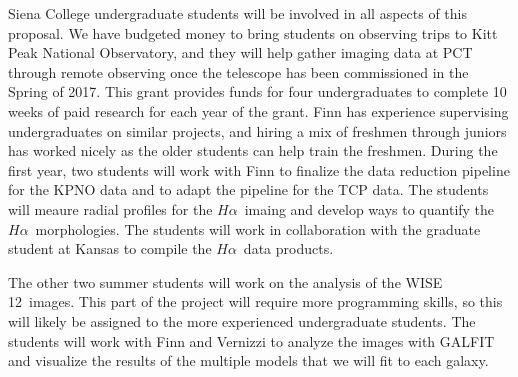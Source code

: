 \documentclass[11pt, preprint]{aastex}
\newcommand{\ha}{$H\alpha$}
\begin{document}
{Siena College undergraduate students will be involved in all aspects
of this proposal.  We have budgeted money to bring students on
observing trips to Kitt Peak National Observatory, and they will help
gather imaging data at PCT through remote observing once the telescope
has been commissioned in the Spring of 2017.  This grant provides funds for four
undergraduates to complete 10 weeks of paid research for each year of
the grant.  Finn has experience supervising undergraduates on similar
projects, and hiring a mix of freshmen through juniors has worked
nicely as the older students can help train the freshmen.  
During the first year, two students will work with Finn to
finalize the data reduction pipeline for the KPNO data and to adapt
the pipeline for the TCP data.  The students will meaure radial
profiles for the \ha \ imaing and develop ways to quantify the \ha \
morphologies.  The students will work in collaboration with the
graduate student at Kansas to compile the \ha \ data products.

The other two summer students will work on the analysis of the WISE
12\micron \ images.  This part of the project will require more
programming skills, so this will likely be assigned to the more
experienced undergraduate students.  The students will work with Finn
and Vernizzi to analyze the images with GALFIT and visualize the
results of the multiple models that we will fit to each galaxy.

}
\end{document}
